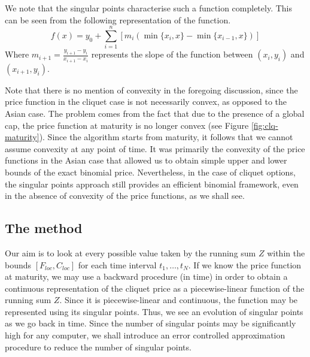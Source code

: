 \begin{rem} \label{rem:clq-char}
	We note that the singular points characterise such a function completely. This can be seen from the following representation of the function.
	\begin{equation}
		\label{eq:clq-function-repr}
		f(x) = y_0 + \sum_{i=1}^n [ m_i ( \min \{x_{i}, x \} - \min \{ x_{i-1}, x \} ) ]
	\end{equation}
	Where $ m_{i+1} = \frac{y_{i+1} - y_{i}}{x_{i+1} - x_{i}} $ represents the slope of the function between $ (x_{i}, y_{i}) $ and $ (x_{i+1}, y_{i}) $.
\end{rem}

\begin{rem}
	Note that there is no mention of convexity in the foregoing discussion, since the price function in the cliquet case is not necessarily convex, as opposed to the Asian case. The problem comes from the fact that due to the presence of a global cap, the price function at maturity is no longer convex (see Figure \ref{fig:clq-maturity}). Since the algorithm starts from maturity, it follows that we cannot assume convexity at any point of time. It was primarily the convexity of the price functions in the Asian case that allowed us to obtain simple upper and lower bounds of the exact binomial price. Nevertheless, in the case of cliquet options, the singular points approach still provides an efficient binomial framework, even in the absence of convexity of the price functions, as we shall see.
\end{rem}



\subsection{The method}
\label{subsec:clq-method}

Our aim is to look at every possible value taken by the running sum $Z$ within the bounds $ [ F_{loc}, C_{loc} ] $ for each time interval $ t_1, \dots, t_{N} $. If we know the price function at maturity, we may use a backward procedure (in time) in order to obtain a continuous representation of the cliquet price as a piecewise-linear function of the running sum $Z$. Since it is piecewise-linear and continuous, the function may be represented using its singular points. Thus, we see an evolution of singular points as we go back in time. Since the number of singular points may be significantly high for any computer, we shall introduce an error controlled approximation procedure to reduce the number of singular points.

